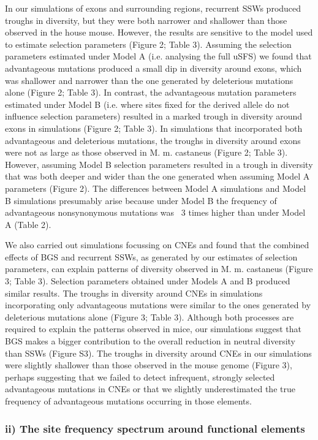 	In our simulations of exons and surrounding regions, recurrent SSWs produced troughs in diversity, but they were both narrower and shallower than those observed in the house mouse. However, the results are sensitive to the model used to estimate selection parameters (Figure 2; Table 3). Assuming the selection parameters estimated under Model A (i.e. analysing the full uSFS) we found that advantageous mutations produced a small dip in diversity around exons, which was shallower and narrower than the one generated by deleterious mutations alone (Figure 2; Table 3). In contrast, the advantageous mutation parameters estimated under Model B (i.e. where sites fixed for the derived allele do not influence selection parameters) resulted in a marked trough in diversity around exons in simulations (Figure 2; Table 3). In simulations that incorporated both advantageous and deleterious mutations, the troughs in diversity around exons were not as large as those observed in M. m. castaneus (Figure 2; Table 3). However, assuming Model B selection parameters resulted in a trough in diversity that was both deeper and wider than the one generated when assuming Model A parameters (Figure 2). The differences between Model A simulations and Model B simulations presumably arise because under Model B the frequency of advantageous nonsynonymous mutations was ~3 times higher than under Model A (Table 2). 

We also carried out simulations focussing on CNEs and found that the combined effects of BGS and recurrent SSWs, as generated by our estimates of selection parameters, can explain patterns of diversity observed in M. m. castaneus (Figure 3; Table 3). Selection parameters obtained under Models A and B produced similar results. The troughs in diversity around CNEs in simulations incorporating only advantageous mutations were similar to the ones generated by deleterious mutations alone (Figure 3; Table 3). Although both processes are required to explain the patterns observed in mice, our simulations suggest that BGS makes a bigger contribution to the overall reduction in neutral diversity than SSWs (Figure S3). The troughs in diversity around CNEs in our simulations were slightly shallower than those observed in the mouse genome (Figure 3), perhaps suggesting that we failed to detect infrequent, strongly selected advantageous mutations in CNEs or that we slightly underestimated the true frequency of advantageous mutations occurring in those elements.

\subsubsection{ii) The site frequency spectrum around functional elements}
 
